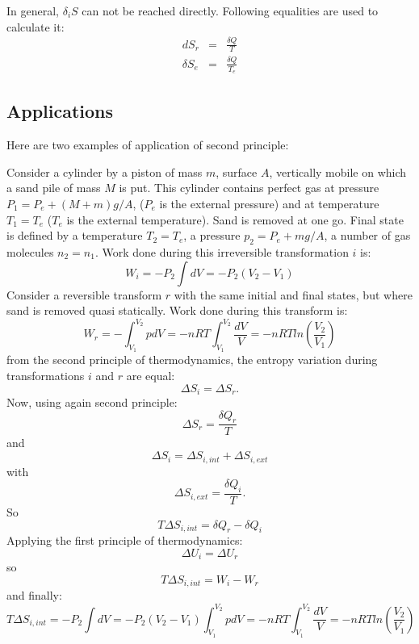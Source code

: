 \documentclass[12pt]{book}
\begin{document}
\begin{rem}
In general, $ \delta_iS $ can not be reached directly. Following equalities
are used to calculate it:
\begin{eqnarray}
dS_r&=&\frac{\delta Q}{T}\\
\delta S_e&=&\frac{\delta Q}{T_e}
\end{eqnarray}
\end{rem}

\subsection{Applications}
Here are two examples of application of second principle:
\begin{exmp}
Consider a cylinder by a piston of mass $m$, surface $A$, vertically mobile on
which a sand pile of mass $M$ is put. This cylinder contains perfect gas at
pressure $P_1=P_e+(M+m)g/A$, ($P_e$ is the external pressure) and at
temperature $T_1=T_e$ ($T_e$ is the external temperature). Sand is removed at
one go. Final state is defined by a temperature $T_2=T_e$, a pressure
$p_2=P_e+mg/A$, a number of gas molecules $n_2=n_1$. Work done during this
irreversible transformation $i$ is:
\begin{equation}
W_i=-P_2\int dV=-P_2(V_2-V_1)
\end{equation}
Consider a reversible transform $r$ with the same initial and final states, but
where sand is removed quasi statically. Work done during this transform is:
\begin{equation}
W_r=-\int_{V_1}^{V_2}pdV =-nRT\int_{V_1}^{V_2}\frac{dV}{V}=
-nRTln(\frac{V_2}{V_1}) 
\end{equation}
from the second principle of thermodynamics, the entropy variation during
transformations $i$ and $r$ are equal:
\begin{equation}
\Delta S_i=\Delta S_r.
\end{equation}
Now, using again second principle:
\begin{equation}
\Delta S_r=\frac{\delta Q_r}{T}
\end{equation}
and
\begin{equation}
\Delta S_i=\Delta S_{i,int}+\Delta S_{i,ext}
\end{equation}
with
\begin{equation}
\Delta S_{i,ext}=\frac{\delta Q_i}{T}.
\end{equation}
So
\begin{equation}
T\Delta S_{i,int}=\delta Q_r-\delta Q_i
\end{equation}    
Applying the first principle of thermodynamics:
\begin{equation}
\Delta U_i=\Delta U_r
\end{equation}
so
\begin{equation}
T\Delta S_{i,int}=W_i-W_r
\end{equation}
and finally:
$$
T\Delta S_{i,int}=-P_2\int
dV=-P_2(V_2-V_1)\int_{V_1}^{V_2}pdV =
-nRT\int_{V_1}^{V_2}\frac{dV}{V}=-nRTln(\frac{V_2}{V_1}) 
$$
\end{exmp}
\end{document}
